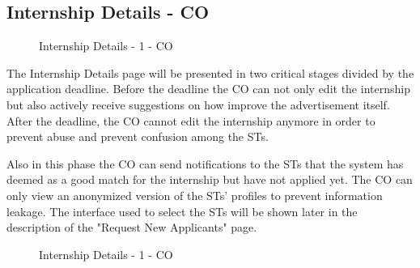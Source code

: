 \subsection{Internship Details - CO}
\label{subsec:internship-details-co}%

\begin{figure}[H]
    \centering
    \caption{Internship Details - 1 - CO}
    \label{fig:internship-details-1-co}
\end{figure}

\par The Internship Details page will be presented in two critical stages divided by the application deadline. Before
the deadline the CO can not only edit the internship but also actively receive suggestions on how improve the
advertisement itself. After the deadline, the CO cannot edit the internship anymore in order to prevent abuse and
prevent confusion among the STs.

\par Also in this phase the CO can send notifications to the STs that the system has deemed as a good match for the
internship but have not applied yet. The CO can only view an anonymized version of the STs' profiles to prevent
information leakage. The interface used to select the STs will be shown later in the description of the "Request New
Applicants" page.

\begin{figure}[H]
    \centering
    \caption{Internship Details - 1 - CO}
    \label{fig:internship-details-2-co}
\end{figure}

